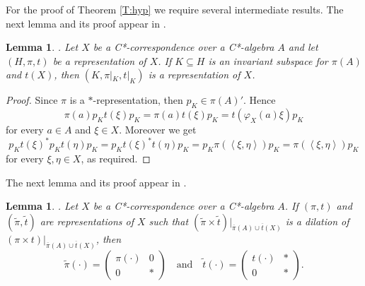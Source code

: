\documentclass[11pt, draft]{amsart}
\numberwithin{equation}{section}
\theoremstyle{plain}
\newtheorem{lemma}[theorem]{Lemma}
\theoremstyle{definition}
\theoremstyle{remark}
\newcommand\vphi{\varphi}
\newcommand{\qand}{\quad\text{and}\quad}
\newcommand{\ol}{\overline}
\newcommand{\wt}{\widetilde}
\newcommand{\sca}[1]{\left\langle#1\right\rangle} %
\begin{document}
For the proof of Theorem \ref{T:hyp} we require several intermediate results.
The next lemma and its proof appear in \cite[Lemma 2.9]{KR20}.

\begin{lemma} \label{L:inv} \cite[Lemma 2.9]{KR20}.
Let $X$ be a C*-correspondence over a C*-algebra $A$ and let $(H, \pi, t)$ be a representation of $X$.
If $K \subseteq H$ is an invariant subspace for $\pi(A)$ and $t(X)$, then $(K, \pi|_K, t|_K)$ is a representation of $X$.
\end{lemma}

\begin{proof}
Since $\pi$ is a $*$-representation, then $p_K \in \pi(A)'$.
Hence
\[
\pi(a) p_K t(\xi)p_K = \pi(a) t(\xi)p_K = t(\vphi_X(a) \xi)p_K
\]
for every $a \in A$ and $\xi \in X$.
Moreover we get
\[
p_K t(\xi)^* p_K t(\eta) p_K
=
p_K t(\xi)^* t(\eta) p_K
=
p_K \pi(\sca{\xi,\eta})p_K
=
\pi(\sca{\xi,\eta})p_K
\]
for every $\xi, \eta \in X$, as required.
\end{proof}

The next lemma and its proof appear in \cite[proof of Claim in Theorem 3.5]{KK12}.

\begin{lemma} \label{L:dilation} \cite[proof of Claim in Theorem 3.5]{KK12}.
Let $X$ be a C*-correspon\-dence over a C*-algebra $A$.
If $(\pi,t)$ and $\left(\wt{\pi},\wt{t}\right)$ are representations of $X$ such that $(\wt{\pi}\times\wt{t})|_{\ol{\pi}(A) \cup \ol{t}(X)}$ is a dilation of $(\pi\times t)|_{\ol{\pi}(A) \cup \ol{t}(X)}$, then 
\[
\wt{\pi}(\cdot)=
\begin{pmatrix}
\pi(\cdot) & 0 \\
0 & *
\end{pmatrix}
\qand
\wt{t}(\cdot)=
\begin{pmatrix}
t(\cdot) & * \\
0 & *
\end{pmatrix}.
\]
\end{lemma}
\end{document}
